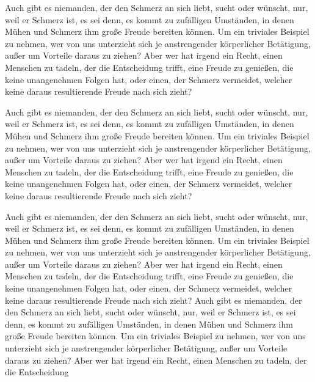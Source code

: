 Auch gibt es niemanden, der den Schmerz an sich liebt, sucht oder wünscht, nur, weil er Schmerz ist, es sei denn, es kommt zu zufälligen Umständen, in denen Mühen und Schmerz ihm große Freude bereiten können. Um ein triviales Beispiel zu nehmen, wer von uns unterzieht sich je anstrengender körperlicher Betätigung, außer um Vorteile daraus zu ziehen? Aber wer hat irgend ein Recht, einen Menschen zu tadeln, der die Entscheidung trifft, eine Freude zu genießen, die keine unangenehmen Folgen hat, oder einen, der Schmerz vermeidet, welcher keine daraus resultierende Freude nach sich zieht?

Auch gibt es niemanden, der den Schmerz an sich liebt, sucht oder wünscht, nur, weil er Schmerz ist, es sei denn, es kommt zu zufälligen Umständen, in denen Mühen und Schmerz ihm große Freude bereiten können. Um ein triviales Beispiel zu nehmen, wer von uns unterzieht sich je anstrengender körperlicher Betätigung, außer um Vorteile daraus zu ziehen? Aber wer hat irgend ein Recht, einen Menschen zu tadeln, der die Entscheidung trifft, eine Freude zu genießen, die keine unangenehmen Folgen hat, oder einen, der Schmerz vermeidet, welcher keine daraus resultierende Freude nach sich zieht?

Auch gibt es niemanden, der den Schmerz an sich liebt, sucht oder wünscht, nur, weil er Schmerz ist, es sei denn, es kommt zu zufälligen Umständen, in denen Mühen und Schmerz ihm große Freude bereiten können. Um ein triviales Beispiel zu nehmen, wer von uns unterzieht sich je anstrengender körperlicher Betätigung, außer um Vorteile daraus zu ziehen? Aber wer hat irgend ein Recht, einen Menschen zu tadeln, der die Entscheidung trifft, eine Freude zu genießen, die keine unangenehmen Folgen hat, oder einen, der Schmerz vermeidet, welcher keine daraus resultierende Freude nach sich zieht? Auch gibt es niemanden, der den Schmerz an sich liebt, sucht oder wünscht, nur, weil er Schmerz ist, es sei denn, es kommt zu zufälligen Umständen, in denen Mühen und Schmerz ihm große Freude bereiten können. Um ein triviales Beispiel zu nehmen, wer von uns unterzieht sich je anstrengender körperlicher Betätigung, außer um Vorteile daraus zu ziehen? Aber wer hat irgend ein Recht, einen Menschen zu tadeln, der die Entscheidung
